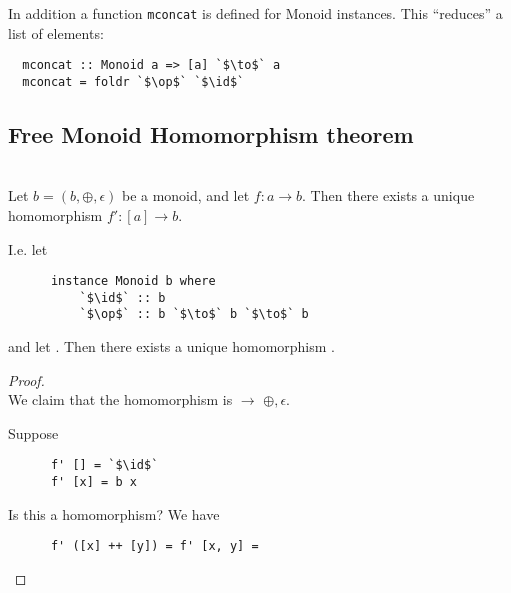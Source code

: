 \documentclass[12pt]{article}
\newcommand{\op}{\oplus}
\newcommand{\id}{\epsilon}
\begin{document}
In addition a function {\tt mconcat} is defined for Monoid instances. This ``reduces'' a list of elements:
\begin{verbatim}
  mconcat :: Monoid a => [a] `$\to$` a
  mconcat = foldr `$\op$` `$\id$`
\end{verbatim}


\subsection{Free Monoid Homomorphism theorem}

\begin{theorem*}~\\
  Let $b = (b, \op, \id)$ be a monoid, and let $f:a \to b$. Then there exists a unique
  homomorphism $f':[a] \to b$.

  I.e. let
  \begin{normalfont}
    \begin{verbatim}
      instance Monoid b where
          `$\id$` :: b
          `$\op$` :: b `$\to$` b `$\to$` b
    \end{verbatim}
  \end{normalfont}
  and let . Then there exists a unique homomorphism .
\end{theorem*}

\begin{proof}~\\
  We claim that the homomorphism is  $\to$ $\op, \id$\mih{)}.

  Suppose
  \begin{normalfont}
    \begin{verbatim}
      f' [] = `$\id$`
      f' [x] = b x
    \end{verbatim}
  \end{normalfont}

  Is this a homomorphism? We have
  \begin{normalfont}
    \begin{verbatim}
      f' ([x] ++ [y]) = f' [x, y] =
    \end{verbatim}
  \end{normalfont}

\end{proof}
\end{document}
